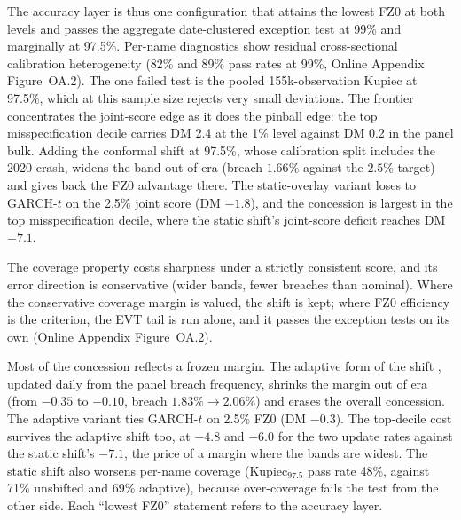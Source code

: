 \documentclass[11pt]{article}
\theoremstyle{remark}
\begin{document}
The accuracy layer is thus one configuration that attains the lowest FZ0 at both levels and passes the aggregate date-clustered exception test at 99\% and marginally at 97.5\%. Per-name diagnostics show residual cross-sectional calibration heterogeneity (82\% and 89\% pass rates at 99\%, Online Appendix Figure~OA.2). The one failed test is the pooled 155k-observation Kupiec at 97.5\%, which at this sample size rejects very small deviations. The frontier concentrates the joint-score
edge as it does the pinball edge: the top misspecification decile
carries DM 2.4 at the 1\% level against DM 0.2 in the panel bulk.
Adding the conformal shift at 97.5\%, whose calibration split includes
the 2020 crash, widens the band out of era (breach $1.66\%$ against the $2.5\%$ target) and gives back the FZ0 advantage there. The static-overlay variant loses to GARCH-$t$ on the 2.5\% joint score (DM $-1.8$), and the concession is largest in the top misspecification decile, where the static shift's joint-score deficit reaches DM $-7.1$.

The coverage
property costs sharpness under
a strictly consistent score, and its error direction is conservative
(wider bands, fewer breaches than nominal). Where the conservative
coverage margin is valued, the shift is kept; where FZ0 efficiency is
the criterion, the EVT tail is run alone, and it passes the exception
tests on its own (Online Appendix Figure~OA.2).

Most of the concession reflects a frozen margin. The adaptive form of the shift \citep{gibbs2021aci}, updated daily from the panel breach frequency, shrinks the margin out of era (from $-0.35$ to $-0.10$, breach $1.83\%\to2.06\%$) and erases the overall concession. The adaptive variant ties GARCH-$t$ on 2.5\% FZ0 (DM $-0.3$). The top-decile cost survives the adaptive shift too, at $-4.8$ and $-6.0$ for the two update rates against the static shift's $-7.1$, the price of a margin where the bands are widest. The static shift also worsens per-name coverage (Kupiec$_{97.5}$ pass rate 48\%, against 71\% unshifted and 69\% adaptive), because over-coverage fails the test from the other side. Each ``lowest FZ0'' statement refers to the accuracy layer.
\end{document}
